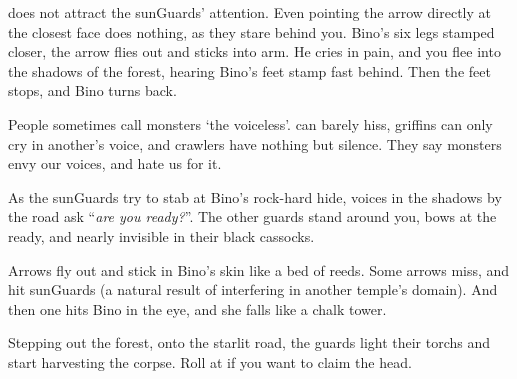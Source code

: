 does not attract the \glspl{sunGuard}' attention.
Even pointing the arrow directly at the closest face does nothing, as they stare behind you.
Bino's six legs stamped closer, the arrow flies out and sticks into  arm.
He cries in pain, and you flee into the shadows of the forest, hearing Bino's feet stamp fast behind.
Then the feet stops, and Bino turns back.

People sometimes call \glspl{monster} `the voiceless'.
 can barely hiss, \glspl{griffin} can only cry in another's voice, and \glspl{crawler} have nothing but silence.
They say \glspl{monster} envy our voices, and hate us for it.

As the \glspl{sunGuard} try to stab at Bino's rock-hard hide, voices in the shadows by the road ask ``\textit{are you ready?}''.
The other \glspl{guard} stand around you, \glspl{bow} at the ready, and nearly invisible in their black cassocks.

Arrows fly out and stick in Bino's skin like a bed of reeds.
Some arrows miss, and hit \glspl{sunGuard} (a natural result of interfering in another \gls{temple}'s domain).
And then one hits Bino in the eye, and she falls like a chalk tower.

Stepping out the forest, onto the starlit road, the \glspl{guard} light their \glspl{torch} and start \gls{harvesting} the corpse.
Roll  at \tn[10] if you want to claim the head.
